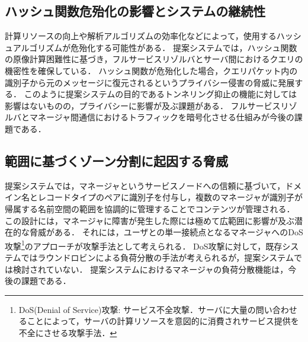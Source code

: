 \subsection{ハッシュ関数危殆化の影響とシステムの継続性}
計算リソースの向上や解析アルゴリズムの効率化などによって，使用するハッシュアルゴリズムが危殆化する可能性がある．
提案システムでは，ハッシュ関数の原像計算困難性に基づき，フルサービスリゾルバとサーバ間におけるクエリの機密性を確保している．
ハッシュ関数が危殆化した場合，クエリパケット内の識別子から元のメッセージに復元されるというプライバシー侵害の脅威に発展する．
このように提案システムの目的であるトンネリング抑止の機能に対しては影響はないものの，プライバシーに影響が及ぶ課題がある．
フルサービスリゾルバとマネージャ間通信におけるトラフィックを暗号化させる仕組みが今後の課題である．


\subsection{範囲に基づくゾーン分割に起因する脅威}
提案システムでは，マネージャというサービスノードへの信頼に基づいて，ドメイン名とレコードタイプのペアに識別子を付与し，複数のマネージャが識別子が帰属する名前空間の範囲を協調的に管理することでコンテンツが管理される．
この設計には，マネージャに障害が発生した際には極めて広範囲に影響が及ぶ潜在的な脅威がある．
それには，ユーザとの単一接続点となるマネージャへのDoS攻撃\footnote{DoS(Denial of Service)攻撃: サービス不全攻撃．サーバに大量の問い合わせることによって，サーバの計算リソースを意図的に消費されサービス提供を不全にさせる攻撃手法．}のアプローチが攻撃手法として考えられる．
DoS攻撃に対して，既存システムではラウンドロビンによる負荷分散の手法が考えられるが，提案システムでは検討されていない．
提案システムにおけるマネージャの負荷分散機能は，今後の課題である．


